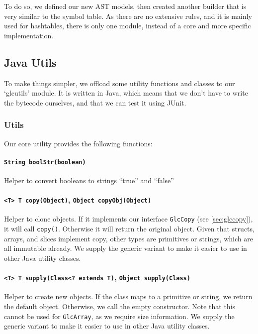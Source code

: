 \documentclass[11pt]{article}
\begin{document}
To do so, we defined our new AST models, then created another builder
that is very similar to the symbol table.  As there are no extensive
rules, and it is mainly used for hashtables, there is only one module,
instead of a core and more specific implementation.

\subsection{Java Utils}

To make things simpler, we offload some utility functions and classes
to our `glcutils' module.  It is written in Java, which means that we
don't have to write the bytecode ourselves, and that we can test it
using JUnit.

\subsubsection{Utils}

Our core utility provides the following functions:

\paragraph{\texttt{String boolStr(boolean)}}

Helper to convert booleans to strings ``true'' and ``false''

\paragraph{\texttt{<T> T copy(Object)}, \texttt{Object
    copyObj(Object)}}

Helper to clone objects. If it implements our interface
\texttt{GlcCopy} (see \ref{sec:glccopy}), it will call
\texttt{copy()}.  Otherwise it will return the original object.  Given
that structs, arrays, and slices implement copy, other types are
primitives or strings, which are all immutable already. We supply the
generic variant to make it easier to use in other Java utility
classes.

\paragraph{\texttt{<T> T supply(Class<?\ extends T)}, \texttt{Object
    supply(Class)}}

Helper to create new objects. If the class maps to a primitive or
string, we return the default object. Otherwise, we call the empty
constructor.
Note that this cannot be used for \texttt{GlcArray}, as we require size information. We supply the generic variant to make it easier to use in other Java utility classes. \\
\end{document}
